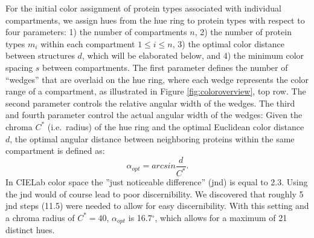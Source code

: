 \documentclass{egpubl}
\begin{document}
	For the initial color assignment of protein types associated with individual compartments, we assign hues from the hue ring to protein types with respect to four parameters: 
	1) the number of compartments $n$, 2) the number of protein types $m_i$ within each compartment $1 \leq i \leq n$, 3) the optimal color distance between structures $d$, which will be elaborated below, and 4) the minimum color spacing $s$ between compartments. 
	The first parameter defines the number of ``wedges'' that are overlaid on the hue ring, where each wedge represents the color range of a compartment, as illustrated in Figure \ref{fig:coloroverview}, top row. 
	The second parameter controls the relative angular width of the wedges. 
	The third and fourth parameter control the actual angular width of the wedges: 
	Given the chroma $C^*$ (i.e.\, radius) of the hue ring and the optimal Euclidean color distance $d$, the optimal angular distance between neighboring proteins within the same compartment is defined as: 
	\begin{equation}%
	\alpha_{opt} = arcsin\frac{d}{C^*}. %
	\end{equation}%
	In CIELab color space the ''just noticeable difference'' (jnd) is equal to 2.3\cite{lee2013perceptually}.
	Using the jnd would of course lead to poor discernibility. 
	We discovered that roughly 5 jnd steps (11.5) were needed to allow for easy discernibility. 
	With this setting and a chroma radius of $C^*=40$, $\alpha_{opt}$ is 16.7$^{\circ}$, which allows for a maximum of 21 distinct hues. 
\end{document}
